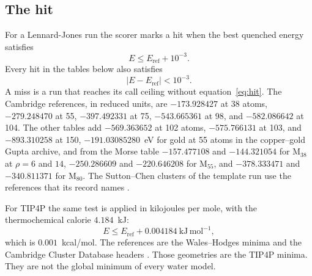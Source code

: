\documentclass[journal=jctcce,manuscript=article]{achemso}
\begin{document}
\subsection{The hit}
\label{sec:hit}
For a Lennard-Jones run the scorer marks a hit when the best quenched
energy satisfies
\begin{equation}
E \le E_{\mathrm{ref}} + 10^{-3}.
\label{eq:hit}
\end{equation}
Every hit in the tables below also satisfies
\begin{equation}
|E - E_{\mathrm{ref}}| < 10^{-3}.
\label{eq:abs}
\end{equation}
A miss is a run that reaches its call ceiling without
equation~\ref{eq:hit}.
The Cambridge references, in reduced units, are \(-173.928427\) at 38
atoms, \(-279.248470\) at 55, \(-397.492331\) at 75, \(-543.665361\) at
98, and \(-582.086642\) at 104.
\cite{walesCambridgeClusterDatabase}
The other tables add
\(-569.363652\) at 102 atoms, \(-575.766131\) at 103, and
\(-893.310258\) at 150, \(-191.03085280\)~eV for gold at 55 atoms in
the copper--gold Gupta archive, and from the Morse table
\(-157.477108\) and \(-144.321054\) for M\(_{38}\) at \(\rho=6\) and
\(14\), \(-250.286609\) and \(-220.646208\) for M\(_{55}\), and
\(-378.333471\) and \(-340.811371\) for M\(_{80}\).
\cite{walesCambridgeClusterDatabase,cleriRosato1993,darbyCuAu2002,doyeWalesMorse1997}
The Sutton--Chen clusters of the template run use the references that its
record names \cite{suttonLongrangeFinnisSinclair1990}.

For TIP4P the same test is applied in kilojoules per mole, with the
thermochemical calorie \(4.184\)~kJ:
\begin{equation}
E \le E_{\mathrm{ref}} + 0.004184~\mathrm{kJ\,mol^{-1}},
\label{eq:tip4p-hit}
\end{equation}
which is \(0.001\)~kcal/mol.
The references are the Wales--Hodges minima and the Cambridge Cluster
Database headers \cite{walesGlobalMinimaWater1998,jorgensen1983}.
Those geometries are the TIP4P minima.
They are not the global minimum of every water model.
\cite{hernandezRojasWater2026}
\end{document}

